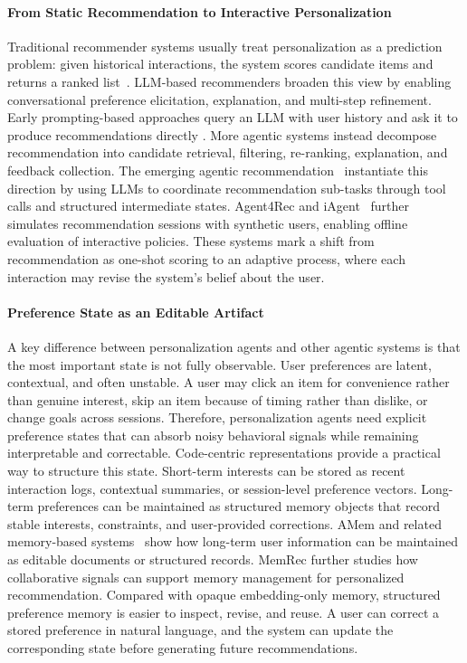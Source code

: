 \documentclass{llmxive}
\begin{document}
\paragraph{From Static Recommendation to Interactive Personalization}
Traditional recommender systems usually treat personalization as a prediction problem: given historical interactions, the system scores candidate items and returns a ranked list~\citep{he2020lightgcn,guo2017deepfm}. LLM-based recommenders broaden this view by enabling conversational preference elicitation, explanation, and multi-step refinement. Early prompting-based approaches query an LLM with user history and ask it to produce recommendations directly \citep{hou2024large, dai2023uncovering}. More agentic systems instead decompose recommendation into candidate retrieval, filtering, re-ranking, explanation, and feedback collection.
The emerging agentic recommendation~\citep{liu2025recoworld,wang2024recmind,huang2025recommender} instantiate this direction by using LLMs to coordinate recommendation sub-tasks through tool calls and structured intermediate states. Agent4Rec \citep{zhang2024generative} and iAgent~\cite{xu2025iagent} further simulates recommendation sessions with synthetic users, enabling offline evaluation of interactive policies. These systems mark a shift from recommendation as one-shot scoring to an adaptive process, where each interaction may revise the system's belief about the user.

\paragraph{Preference State as an Editable Artifact}
A key difference between personalization agents and other agentic systems is that the most important state is not fully observable. User preferences are latent, contextual, and often unstable. A user may click an item for convenience rather than genuine interest, skip an item because of timing rather than dislike, or change goals across sessions. Therefore, personalization agents need explicit preference states that can absorb noisy behavioral signals while remaining interpretable and correctable.
Code-centric representations provide a practical way to structure this state. Short-term interests can be stored as recent interaction logs, contextual summaries, or session-level preference vectors. Long-term preferences can be maintained as structured memory objects that record stable interests, constraints, and user-provided corrections. AMem \citep{xu2026mem} and related memory-based systems~\citep{wei2025evo,chhikara2025mem0} show how long-term user information can be maintained as editable documents or structured records. MemRec \citep{chen2026memrec} further studies how collaborative signals can support memory management for personalized recommendation. Compared with opaque embedding-only memory, structured preference memory is easier to inspect, revise, and reuse. A user can correct a stored preference in natural language, and the system can update the corresponding state before generating future recommendations.
\end{document}
